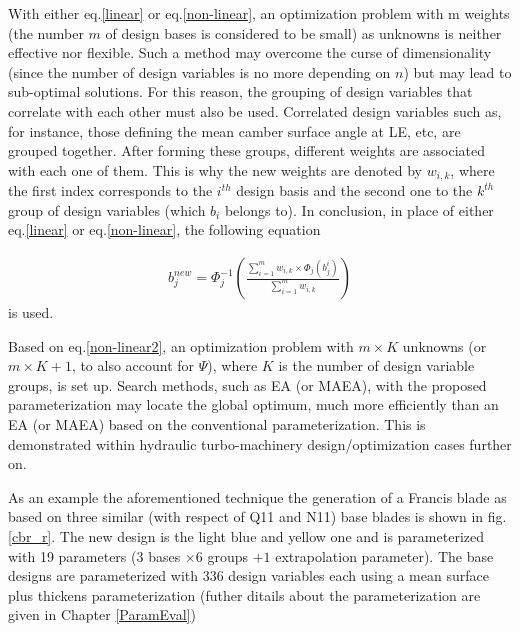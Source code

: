 With either eq.\ref{linear} or eq.\ref{non-linear}, an optimization problem with m weights (the number $m$ of design bases is considered to be small) as unknowns is neither effective nor flexible. Such a method may overcome the curse of dimensionality (since the number of design variables is no more depending on $n$) but may lead to sub-optimal solutions. For this reason, the grouping of design variables that correlate with each other must also be used. Correlated design variables such as, for instance, those defining the mean camber surface angle at LE, etc, are grouped together. After forming these groups, different weights are associated with each one of them. This is why the new weights are denoted by $w_{i,k}$, where the first index corresponds to the $i^{th}$ design basis and the second one to the $k^{th}$ group of design variables (which $b_i$ belongs to). In conclusion, in place of either eq.\ref{linear} or eq.\ref{non-linear}, the following equation


\begin{eqnarray}
   b_j^{new} = \Phi _j^{-1} (\frac{\sum_{i=1}^{m}w_{i,k} \times \Phi _j(b_j^i)}{\sum_{i=1}^{m}w_{i,k} }) 
   \label{non-linear2} 
\end{eqnarray}
is used. 

Based on eq.\ref{non-linear2}, an optimization problem with $m \times K$ unknowns (or $m\times K+1$, to also account for $\Psi$), where $K$ is the number of design variable groups, is set up. Search methods, such as EA (or MAEA), with the proposed parameterization may locate the global optimum, much more efficiently than an EA (or MAEA) based on the conventional parameterization. This is demonstrated within hydraulic turbo-machinery design/optimization cases further on. 


As an example the aforementioned technique the generation of a Francis blade as based on three similar (with respect of Q11 and N11) base blades is shown in fig.\ref{cbr_r}. The new design is the light blue and yellow one and is parameterized with 19 parameters ($3$ bases $\times 6$ groups $+1$ extrapolation parameter). The base designs are parameterized with 336 design variables each using a mean surface plus thickens parameterization (futher ditails about the parameterization are given in Chapter \ref{ParamEval})


